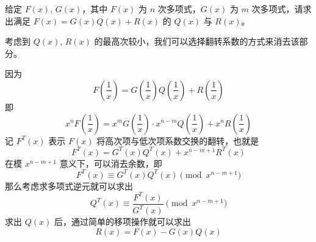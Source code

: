给定 $F(x),\,G(x)$，其中 $F(x)$ 为 $n$ 次多项式，$G(x)$ 为 $m$ 次多项式，请求出满足 $F(x) = G(x)Q(x) + R(x)$ 的 $Q(x)$ 与 $R(x)$。

考虑到 $Q(x),\,R(x)$ 的最高次较小，我们可以选择翻转系数的方式来消去该部分。

因为
\[
F\left(\frac{1}{x}\right) = G\left(\frac{1}{x}\right)Q\left(\frac{1}{x}\right) + R\left(\frac{1}{x}\right)
\]
即
\[
x^nF\left(\frac{1}{x}\right) = x^{m}G\left(\frac{1}{x}\right)\cdot x^{n-m}Q\left(\frac{1}{x}\right) + x^nR\left(\frac{1}{x}\right)
\]
记 $F^T(x)$ 表示 $F(x)$ 将高次项与低次项系数交换的翻转，也就是
\[
F^T(x) = G^T(x)Q^T(x) + x^{n-m+1}R^T(x)
\]
在模 $x^{n-m+1}$ 意义下，可以消去余数，即
\[
F^T(x) \equiv G^T(x)Q^T(x) \pmod{x^{n-m+1}}
\]
那么考虑求多项式逆元就可以求出
\[
Q^T(x) \equiv \frac{F^T(x)}{G^T(x)} \pmod{x^{n-m+1}}
\]
求出 $Q(x)$ 后，通过简单的移项操作就可以求出
\[
R(x) = F(x) - G(x)Q(x)
\]